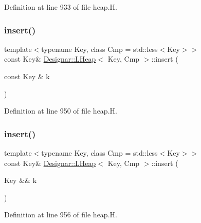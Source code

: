 Definition at line 933 of file heap.\+H.

\mbox{\label{class_designar_1_1_l_heap_afda890a8ad2058013a93ec6b3dbcb38d}} 
\subsubsection{\texorpdfstring{insert()}{insert()}\hspace{0.1cm}{\footnotesize\ttfamily [1/2]}}
{\footnotesize\ttfamily template$<$typename Key, class Cmp = std\+::less$<$\+Key$>$$>$ \\
const Key\& \hyperlink{class_designar_1_1_l_heap}{Designar\+::\+L\+Heap}$<$ Key, Cmp $>$\+::insert (\begin{DoxyParamCaption}\item[{const Key \&}]{k }\end{DoxyParamCaption})\hspace{0.3cm}{\ttfamily [inline]}}



Definition at line 950 of file heap.\+H.

\mbox{\label{class_designar_1_1_l_heap_a45e3853d6d7cd17fd5b56aa572fd6042}} 
\subsubsection{\texorpdfstring{insert()}{insert()}\hspace{0.1cm}{\footnotesize\ttfamily [2/2]}}
{\footnotesize\ttfamily template$<$typename Key, class Cmp = std\+::less$<$\+Key$>$$>$ \\
const Key\& \hyperlink{class_designar_1_1_l_heap}{Designar\+::\+L\+Heap}$<$ Key, Cmp $>$\+::insert (\begin{DoxyParamCaption}\item[{Key \&\&}]{k }\end{DoxyParamCaption})\hspace{0.3cm}{\ttfamily [inline]}}



Definition at line 956 of file heap.\+H.

\mbox{\label{class_designar_1_1_l_heap_a03ae70dddd0511210308b666c69c75e5}} 
